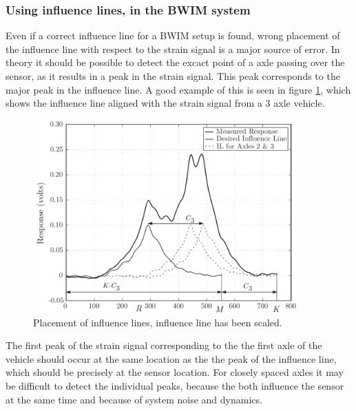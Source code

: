 \subsubsection{Using influence lines, in the BWIM system}
Even if a correct influence line for a BWIM setup is found, wrong placement of the influence line with respect to the strain signal is a major source of error. In theory it should be possible to detect the excact point of a axle passing over the sensor, as it results in a peak in the strain signal. This peak corresponds to the major peak in the influence line. A good example of this is seen in figure \ref{fig:strain_vs_influenceLine}, which shows the influence line aligned with the strain signal from a 3 axle vehicle.
\begin{figure}[htbp]
	\begin{adjustbox}{center}
		\includegraphics[width=0.9\textwidth]{figures/strain_vs_influenceline}
	\end{adjustbox}
	\caption{Placement of influence lines, influence line has been scaled.}
	\label{fig:strain_vs_influenceLine}
\end{figure}
The first peak of the strain signal corresponding to the the first axle of the vehicle should occur at the same location as the the peak of the influence line, which should be precisely at the sensor location.
For closely spaced axles it may be difficult to detect the individual peaks, because the both influence the sensor at the same time and because of system noise and dynamics.


